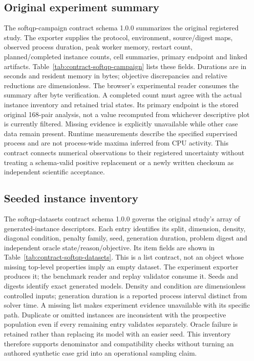 \subsection{Original experiment summary}\label{sec:contract-softqp-campaign} %
The softqp-campaign contract schema 1.0.0 summarizes the original registered %
study. The exporter supplies the protocol, environment, source/digest maps,
observed process duration, peak worker memory, restart count, planned/completed
instance counts, cell summaries, primary endpoint and linked artifacts.
Table~\ref{tab:contract-softqp-campaign} lists these fields. Durations are in %
seconds and resident memory in bytes; objective discrepancies and relative
reductions are dimensionless. The browser's experimental reader consumes the
summary after byte verification. A completed count must agree with the actual
instance inventory and retained trial states. Its primary endpoint is the
stored original 168-pair analysis, not a value recomputed from whichever
descriptive plot is currently filtered. Missing evidence is explicitly
unavailable while other case data remain present. Runtime measurements describe
the specified supervised process and are not process-wide maxima inferred
from CPU activity. This contract connects numerical observations to their
registered uncertainty without treating a schema-valid positive replacement
or a newly written checksum as independent scientific acceptance.

\subsection{Seeded instance inventory}\label{sec:contract-softqp-datasets}
The softqp-datasets contract schema 1.0.0 governs the original study's array
of generated-instance descriptors. Each entry identifies its split, dimension,
density, diagonal condition, penalty family, seed, generation duration,
problem digest and independent oracle state/reason/objective. Its item fields
are shown in Table~\ref{tab:contract-softqp-datasets}. This is a list contract,
not an object whose missing top-level properties imply an empty dataset.
The experiment exporter produces it; the benchmark reader and replay validator
consume it. Seeds and digests identify exact generated models. Density and
condition are dimensionless controlled inputs; generation duration is a
reported process interval distinct from solver time. A missing list makes
experiment evidence unavailable with its specific path. Duplicate or omitted
instances are inconsistent with the prospective population even if every
remaining entry validates separately. Oracle failure is retained rather than
replacing its model with an easier seed. This inventory therefore supports
denominator and compatibility checks without turning an authored synthetic
case grid into an operational sampling claim.


